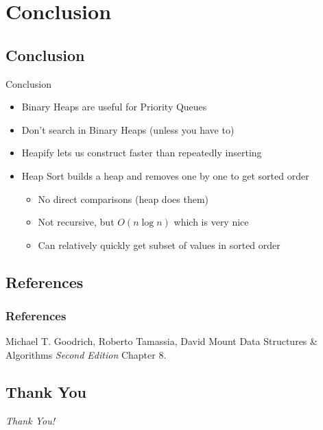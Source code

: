 \documentclass[10pt,compress]{beamer}
\begin{document}
\section{Conclusion}

\subsection{Conclusion}

\begin{frame}{Conclusion}
  \begin{itemize}
    \item Binary Heaps are useful for Priority Queues
    \item Don't search in Binary Heaps (unless you have to)
    \item Heapify lets us construct faster than repeatedly inserting
    \item Heap Sort builds a heap and removes one by one to get sorted order
          \begin{itemize}
            \item No direct comparisons (heap does them)
            \item Not recursive, but $O(n\log n)$ which is very nice
            \item Can relatively quickly get subset of values in sorted order
          \end{itemize}
  \end{itemize}
\end{frame}




\subsection{References}

\begin{frame}
  \frametitle{References}
  \footnotesize{
    \begin{thebibliography}{99} %
       Michael T. Goodrich, Roberto Tamassia, David Mount
      \newblock Data Structures \& Algorithms
      \newblock \emph{Second Edition} Chapter 8.
    \end{thebibliography}
  }
\end{frame}


\subsection{Thank You}

\begin{frame}{}
  \centering \Huge
  \emph{Thank You!}
\end{frame}

\end{document}
